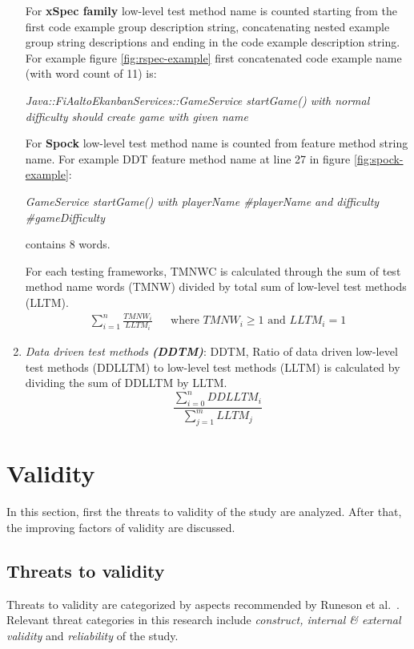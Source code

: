 \begin{addmargin}[0em]{0em}
\begin{enumerate}
    For \textbf{xSpec family} low-level test method name is counted starting from the first code example group description string,
    concatenating nested example group string descriptions and ending in the code example description string.
    For example figure \ref{fig:rspec-example} first concatenated code example name (with word count of 11) is:

    \begin{center}
    \textit{Java::FiAaltoEkanbanServices::GameService startGame() with normal difficulty should create game with given name}
    \end{center}

    For \textbf{Spock} low-level test method name is counted from feature method string name. For example DDT feature method name at
    line 27 in figure \ref{fig:spock-example}:
    \begin{center}
    \textit{GameService startGame() with playerName \#playerName and difficulty \#gameDifficulty}
    \end{center}
    contains 8 words.

    For each testing frameworks, TMNWC is calculated through the sum of test method name words (TMNW) divided by total sum of low-level test methods (LLTM).
    \begin{align*}
        \sum_{i=1}^{n}\frac{TMNW_{i}}{LLTM_{i}} && \text {where } TMNW_{i} \geq 1 \text{ and } LLTM_{i} = 1
    \end{align*}

    \item \textit{Data driven test methods \textbf{(DDTM)}}:
    DDTM, Ratio of data driven low-level test methods (DDLLTM) to low-level test methods (LLTM) is calculated by dividing the sum
    of DDLLTM by LLTM.
    \[\frac{\sum_{i=0}^{n}DDLLTM_{i}}{\sum_{j=1}^{m}LLTM_{j}}\]
    \end{enumerate}
    \end{addmargin}

\section{Validity}
In this section, first the threats to validity of the study are analyzed. After that, the improving factors of validity
are discussed.

\subsection{Threats to validity}
Threats to validity are categorized by aspects recommended by Runeson et al.~\cite{runeson2012case}. Relevant threat categories in
this research include \textit{construct, internal \& external validity} and \textit{reliability} of the study.

